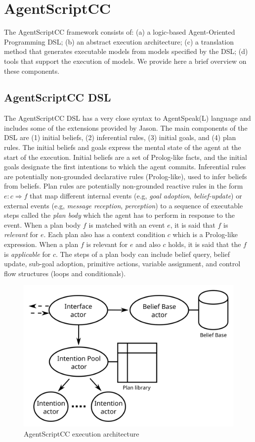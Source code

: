\section{AgentScriptCC}
The AgentScriptCC framework consists of: (a) a logic-based Agent-Oriented Programming DSL; (b) an abstract execution architecture; (c) a translation method that generates executable models from models specified by the DSL; (d) tools that support the execution of models. We provide here a brief overview on these components.

\subsection{AgentScriptCC DSL}
\label{section_dsl}
The AgentScriptCC DSL has a very close syntax to AgentSpeak(L) language and includes some of the extensions provided by Jason. The main components of the DSL are (1) initial beliefs, (2) inferential rules, (3) initial goals, and (4) plan rules. The initial beliefs and goals express the mental state of the agent at the start of the execution. Initial beliefs are a set of Prolog-like facts, 
and the initial goals designate the first intentions to which the agent commits. Inferential rules are potentially non-grounded declarative rules (Prolog-like), used to infer beliefs from beliefs. Plan rules are potentially non-grounded reactive rules in the form $e : c \Rightarrow f$ that map different internal events (e.g, \textit{goal adoption}, \textit{belief-update}) or external events (e.g, \textit{message reception}, \textit{perception}) to a sequence of executable steps called the \textit{plan body} which the agent has to perform in response to the event. When a plan body $f$ is matched with an event $e$, it is said that $f$ is \textit{relevant} for $e$. Each plan also has a context condition $c$ which is a Prolog-like expression. When a plan $f$ is relevant for $e$ and also $c$ holds, it is said that the $f$ is \textit{applicable} for $c$. The steps of a plan body can include belief query, belief update, sub-goal adoption, primitive actions, variable assignment,  and control flow structures %
(loops and conditionals). %

\begin{figure}[t!]
  \centering
  \hspace{-5pt}
  \includegraphics[width=0.75\linewidth]{ch2/arch3.png}
  \caption{AgentScriptCC execution architecture}
\end{figure}

